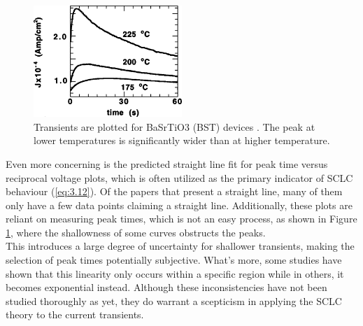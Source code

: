 

\begin{figure}[htbp!] 
\centering    
\includegraphics[width=0.5\textwidth]{Chapter3/Figs/3b.png}
\caption[Transient's peak identification]{Transients are plotted for BaSrTiO3 (BST) devices \cite{boikov2002near}. The peak at lower temperatures is significantly wider than at higher temperature.}
\label{fig:3b}
\end{figure}


\noindent Even more concerning is the predicted straight line fit for peak time versus reciprocal voltage plots, which is often utilized as the primary indicator of SCLC behaviour (\ref{eq:3.12}). Of the papers that present a straight line, many of them only have a few data points claiming a straight line. Additionally, these plots are reliant on measuring peak times, which is not an easy process, as shown in Figure \ref{fig:3b}, where the shallowness of some curves obstructs the peaks. \\

\noindent This introduces a large degree of uncertainty for shallower transients, making the selection of peak times potentially subjective. What's more, some studies have shown that this linearity only occurs within a specific region while in others, it becomes exponential instead. Although these inconsistencies have not been studied thoroughly as yet, they do warrant a scepticism in applying the SCLC theory to the current transients.\\

